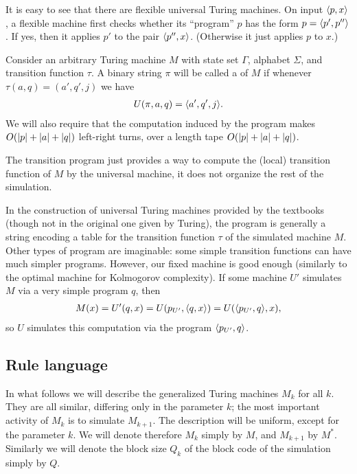 \documentclass[12pt]{memoir}
\begin{document}
It is easy to see that there are flexible universal Turing machines.
On input \( {\mathopen\langle p,x\mathclose\rangle} \),
a flexible machine first checks whether its ``program'' \( p \) 
has the form \( p={\mathopen\langle p',p''\mathclose\rangle} \).
If yes, then it applies \( p' \) to the pair \( {\mathopen\langle p'',x\mathclose\rangle} \).
(Otherwise it just applies \( p \) to \( x \).)

\begin{definition}
  Consider an arbitrary Turing machine \( M \) with state set \( \Gamma \), alphabet
\( \Sigma \), and transition function \( \tau \).
A binary string \( \pi \) will be called a  of \( M \) if
whenever \( \tau(a,q)=(a',q',j) \) we have
 \begin{align*}
 U(\pi,a,q)={\mathopen\langle a',q',j\mathclose\rangle}.
 \end{align*}
We will also require that the computation induced by the program makes
\( O(\lvert p \rvert+\lvert a \rvert+\lvert q \rvert) \) left-right turns, over a length tape \( O(\lvert p \rvert+\lvert a \rvert+\lvert q \rvert) \).
\end{definition}

The transition program just provides a way to compute
the (local) transition function of \( M \) by the universal machine,
it does not organize the rest of the simulation.

\begin{remark}
 In the construction of universal Turing machines provided by the textbooks
(though not in the original one given by Turing), the program is generally a string
encoding a table for the transition
function \( \tau \) of the simulated machine \( M \).
Other types of program are imaginable: some simple transition functions can
have much simpler programs.
However, our fixed machine is good enough (similarly to the optimal machine
for Kolmogorov complexity).
If some machine \( U' \) simulates \( M \) via a
very simple program \( q \), then
 \begin{align*}
     M(x)=U'(q,x) = U(p_{U'},{\mathopen\langle q,x\mathclose\rangle}) = U({\mathopen\langle p_{U'},q\mathclose\rangle},x),
 \end{align*}
so \( U \) simulates this computation via the program \( {\mathopen\langle p_{U'},q\mathclose\rangle} \).
\end{remark}

\subsection{Rule language}\label{sec:language}

In what follows we will describe the generalized Turing machines \( M_{k} \) for all \( k \).
They are all similar, differing only in the parameter \( k \); the most important activity
of \( M_{k} \) is to simulate \( M_{k+1} \).
The description will be uniform, except for the parameter \( k \).
We will denote therefore \( M_{k} \) simply by \( M \), and \( M_{k+1} \)  by \( M^{*} \).
Similarly we will denote the block size \( Q_{k} \) of the block code of the 
simulation simply by \( Q \).
\end{document}
